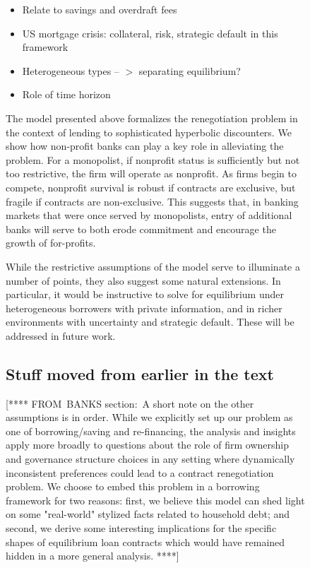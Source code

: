 \documentclass[11pt]{article}%
\begin{document}
\begin{figure}
{\begin{itemize}
\begin{itemize}
\item Relate to savings and overdraft fees

\item US mortgage crisis: collateral, risk, strategic default in this framework

\item Heterogeneous types --%
$>$
separating equilibrium?

\item Role of time horizon
\end{itemize}
\end{itemize}

\bigskip

The model presented above formalizes the renegotiation problem in the context
of lending to sophisticated hyperbolic discounters. We show how non-profit
banks can play a key role in alleviating the problem. For a monopolist, if
nonprofit status is sufficiently but not too restrictive, the firm will
operate as nonprofit. As firms begin to compete, nonprofit survival is robust
if contracts are exclusive, but fragile if contracts are non-exclusive. This
suggests that, in banking markets that were once served by monopolists, entry
of additional banks will serve to both erode commitment and encourage the
growth of for-profits.

While the restrictive assumptions of the model serve to illuminate a number of
points, they also suggest some natural extensions. In particular, it would be
instructive to solve for equilibrium under heterogeneous borrowers with
private information, and in richer environments with uncertainty and strategic
default. These will be addressed in future work.

\subsection{Stuff moved from earlier in the text}

[**** FROM\ BANKS section:\ A short note on the other assumptions is in order.
While we explicitly set up our problem as one of borrowing/saving and
re-financing, the analysis and insights apply more broadly to questions about
the role of firm ownership and governance structure choices in any setting
where dynamically inconsistent preferences could lead to a contract
renegotiation problem. We choose to embed this problem in a borrowing
framework for two reasons: first, we believe this model can shed light on some
"real-world" stylized facts related to household debt; and second, we derive
some interesting implications for the specific shapes of equilibrium loan
contracts which would have remained hidden in a more general analysis. ****]

}
\end{figure}
\end{document}
